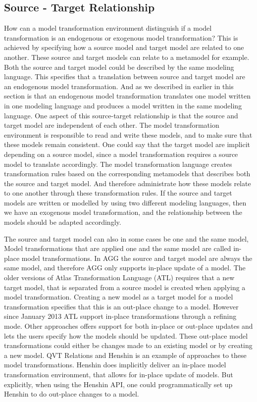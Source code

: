 \subsection{Source - Target Relationship}

How can a model transformation environment distinguish if a model
transformation is an endogenous or exogenous model transformation? This is
achieved by specifying how a source model and target model are related to one
another. These source and target models can relate to a metamodel for example.
Both the source and target model could be described by the same modeling
language. This specifies that a translation between source and target model are
an endogenous model transformation. And as we described in earlier in this
section is that an endogenous model transformation translates one model written
in one modeling language and produces a model written in the same modeling
language. One aspect of this source-target relationship is that the source and
target model are independent of each other. The model transformation
environment is responsible to read and write these models, and to make sure that
these models remain consistent. One could say that the target model are
implicit depending on a source model, since a model transformation requires a
source model to translate accordingly. The model transformation language creates
transformation rules based on the corresponding metamodels that describes both
the source and target model. And therefore administrate how these models relate
to one another through these transformation rules. If the source and target
models are written or modelled by using two different modeling languages, then
we have an exogenous model transformation, and the relationship between the
models should be adapted accordingly.

The source and target model can also in some cases be one and the same model,
Model transformations that are applied one and the same model are called
in-place model transformations. In AGG the source and target model are always
the same model, and therefore AGG only supports in-place update of a model.
The older versions of Atlas Transformation Language (ATL) requires that a new
target model, that is separated from a source model is created when applying a
model transformation. Creating a new model as a target model for a model
transformation specifies that this is an out-place change to a model. However
since January 2013 ATL support in-place transformations through a refining
mode. Other approaches offers support for both in-place or out-place updates
and lets the users specify how the models should be updated. These out-place
model transformations could either be changes made to an existing model or by
creating a new model. QVT Relations and Henshin is an example of approaches to
these model transformations. Henshin does implicitly deliver an in-place model
transformation environment, that allows for in-place update of models. But
explicitly, when using the Henshin API, one could programmatically set up
Henshin to do out-place changes to a model.

